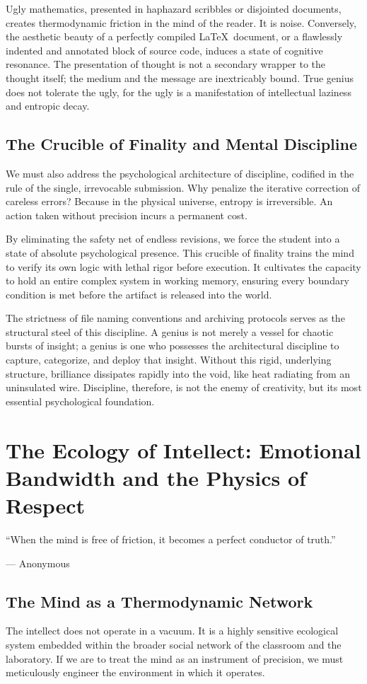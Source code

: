 \documentclass[11pt,a4paper,oneside]{book}
\theoremstyle{definition}
\theoremstyle{remark}
\begin{document}
Ugly mathematics, presented in haphazard scribbles or disjointed documents, creates thermodynamic friction in the mind of the reader. It is noise. Conversely, the aesthetic beauty of a perfectly compiled \LaTeX\ document, or a flawlessly indented and annotated block of source code, induces a state of cognitive resonance. The presentation of thought is not a secondary wrapper to the thought itself; the medium and the message are inextricably bound. True genius does not tolerate the ugly, for the ugly is a manifestation of intellectual laziness and entropic decay.

\section{The Crucible of Finality and Mental Discipline}
We must also address the psychological architecture of discipline, codified in the rule of the single, irrevocable submission. Why penalize the iterative correction of careless errors? Because in the physical universe, entropy is irreversible. An action taken without precision incurs a permanent cost.

By eliminating the safety net of endless revisions, we force the student into a state of absolute psychological presence. This crucible of finality trains the mind to verify its own logic with lethal rigor before execution. It cultivates the capacity to hold an entire complex system in working memory, ensuring every boundary condition is met before the artifact is released into the world. 

The strictness of file naming conventions and archiving protocols serves as the structural steel of this discipline. A genius is not merely a vessel for chaotic bursts of insight; a genius is one who possesses the architectural discipline to capture, categorize, and deploy that insight. Without this rigid, underlying structure, brilliance dissipates rapidly into the void, like heat radiating from an uninsulated wire. Discipline, therefore, is not the enemy of creativity, but its most essential psychological foundation.

\chapter{The Ecology of Intellect: Emotional Bandwidth and the Physics of Respect}
\epigraph{``When the mind is free of friction, it becomes a perfect conductor of truth.''}{--- Anonymous}

\section{The Mind as a Thermodynamic Network}
The intellect does not operate in a vacuum. It is a highly sensitive ecological system embedded within the broader social network of the classroom and the laboratory. If we are to treat the mind as an instrument of precision, we must meticulously engineer the environment in which it operates.
\end{document}
